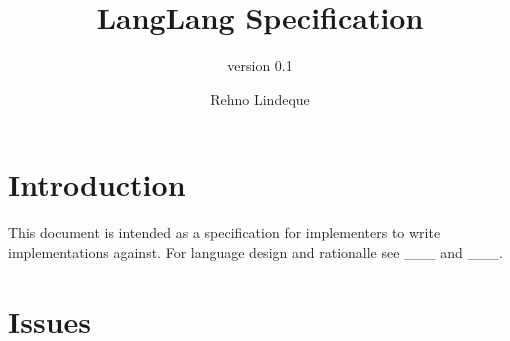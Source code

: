 \documentclass[11pt]{article}
\begin{document}
\title{LangLang Specification}
\subtitle{version 0.1}
\author{Rehno Lindeque}

\maketitle

\section{Introduction}
This document is intended as a specification for implementers to write implementations against. For language design and rationalle see ___ and ___.

\section{Issues}


\end{document}
